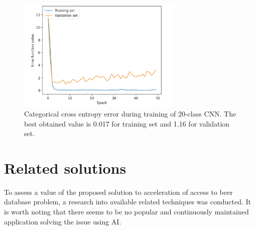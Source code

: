\documentclass[11pt]{article}
\begin{document}
\begin{figure}[h]
\includegraphics[width=0.7\textwidth]{20_class_err}
\centering
\caption{Categorical cross entropy error during training of 20-class CNN. The best obtained value is 0.017 for training set and 1.16 for validation set.}
\label{fig:20_class_err}
\end{figure}
\clearpage

\section{Related solutions} \label{related_solutions}
To assess a value of the proposed solution to acceleration of access to beer database problem, a research into available related techniques was conducted. It is worth noting that there seems to be no popular and continuously maintained application solving the issue using AI. 
\end{document}
